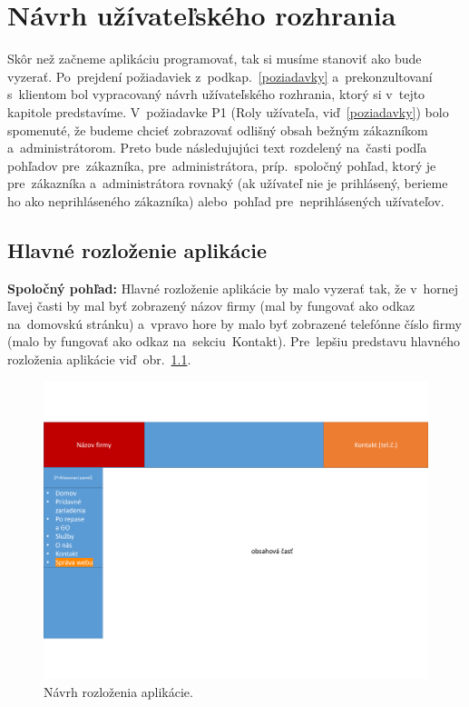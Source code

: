 \chapter{Návrh užívateľského rozhrania}
\label{navrh ui}

Skôr než začneme aplikáciu programovať, tak si musíme stanoviť ako bude vyzerať. Po~prejdení požiadaviek z~podkap.~\ref{poziadavky} a~prekonzultovaní s~klientom bol vypracovaný návrh užívateľského rozhrania, ktorý si v~tejto kapitole predstavíme. V~požiadavke P1 (Roly užívateľa, viď~\ref{poziadavky}) bolo spomenuté, že budeme chcieť zobrazovať odlišný obsah bežným zákazníkom a~administrátorom. Preto bude následujujúci text rozdelený na~časti podľa pohľadov pre~zákazníka, pre~administrátora, príp.~spoločný pohľad, ktorý je pre~zákazníka a~administrátora rovnaký (ak užívateľ nie je prihlásený, berieme ho ako neprihláseného zákazníka) alebo~pohľad pre~neprihlásených užívateľov.

\section{Hlavné rozloženie aplikácie}
\label{hlavne rozlozenie aplikacie}

\textbf{Spoločný pohľad:} Hlavné rozloženie aplikácie by malo vyzerať tak, že v~hornej ľavej časti by mal byť zobrazený názov firmy (mal by fungovať ako odkaz na~domovskú stránku) a~vpravo hore by malo byť zobrazené telefónne číslo firmy (malo by fungovať ako odkaz na~sekciu~Kontakt). Pre~lepšiu predstavu hlavného rozloženia aplikácie viď~obr.~\ref{layout}.

\begin{figure}[H]\centering
\includegraphics[width=140mm]{../img/UI concept/layout}
\caption{Návrh rozloženia aplikácie.}
\label{layout}
\end{figure}

